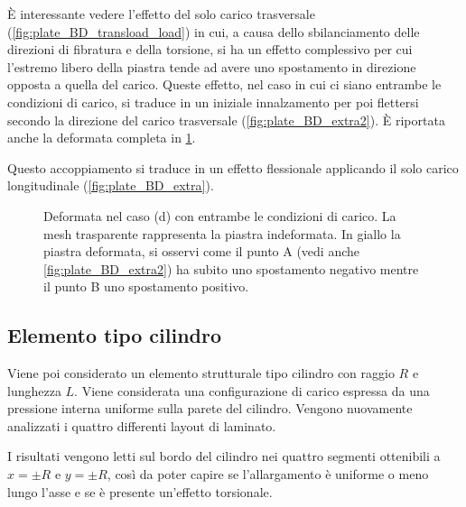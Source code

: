 \documentclass[a4paper,num-refs]{oup-contemporary}
\begin{document}
È interessante vedere l'effetto del solo carico trasversale (\cref{fig:plate_BD_transload_load}) in cui, a causa dello sbilanciamento delle direzioni di fibratura e della torsione, si ha un effetto complessivo per cui l'estremo libero della piastra tende ad avere uno spostamento in direzione opposta a quella del carico.  Queste effetto, nel caso in cui ci siano entrambe le condizioni di carico, si traduce in un iniziale innalzamento per poi flettersi secondo la direzione del carico trasversale (\cref{fig:plate_BD_extra2}). È riportata anche la deformata completa in \cref{fig:deformata_D}.

Questo accoppiamento si traduce in un effetto flessionale applicando il solo carico longitudinale (\cref{fig:plate_BD_extra}).

\begin{figure}[bt!]
	\caption{Deformata nel caso (d) con entrambe le condizioni di carico. La mesh trasparente rappresenta la piastra indeformata. In giallo la piastra deformata, si osservi come il punto A  (vedi anche \cref{fig:plate_BD_extra2}) ha subito uno spostamento negativo mentre il punto B uno spostamento positivo.}
	\label{fig:deformata_D}
\end{figure}

\subsection{Elemento tipo cilindro}

Viene poi considerato un elemento strutturale tipo cilindro con raggio $R$ e lunghezza $L$. Viene considerata una configurazione di carico espressa da una pressione interna uniforme sulla parete del cilindro. Vengono nuovamente analizzati i quattro differenti layout di laminato.

I risultati vengono letti sul bordo del cilindro nei quattro segmenti ottenibili a $x=\pm R$ e $y=\pm R$, così da poter capire se l'allargamento è uniforme o meno lungo l'asse e se è presente un'effetto torsionale. 
\end{document}
